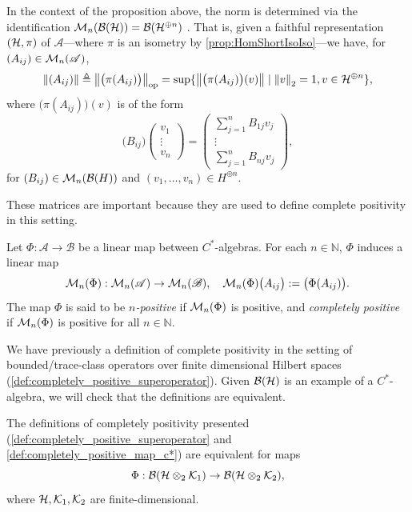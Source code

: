 In the context of the proposition above, the norm is determined via the identification $\mathcal{M}_n(\mathcal{B}(\mathcal{H})) =\mathcal{B}(\mathcal{H}^{\oplus n})$
\cite[Exercises~1.1 and~1.2]{paulsenCompletelyBoundedMaps2003}. That is, given a faithful representation \((\mathcal{H}, \pi)\) of \(\mathscr{A}\)---where \(\pi\) is an isometry by \autoref{prop:HomShortIsoIso}---we have, for \((A_{ij}) \in \mathcal{M}_{n}(\mathscr{A})\),
\[
\left\lVert (A_{ij}) \right\rVert \triangleq \left\lVert \big(\pi (A_{ij}) \big) \right\rVert_{\text{op}} = \sup\{ \left\lVert  \big(\pi (A_{ij}) \big) (v) \right\rVert \mid \left\lVert v \right\rVert_{2} = 1, v \in \mathcal{H}^{\oplus n} \},
\]
where $\big(\pi (A_{ij})\big) (v) $ is of the form 
\[
\bigl(B_{ij}\bigr)
\begin{pmatrix}
v_{1} \\
\vdots \\
v_{n}
\end{pmatrix}
=
\begin{pmatrix}
\displaystyle\sum_{j=1}^n B_{1j} v_{j} \\
\vdots \\
\displaystyle\sum_{j=1}^n B_{nj} v_{j}
\end{pmatrix},
\]
for $(B_{ij}) \in \mathcal{M}_{n}(\mathcal{B}(H))$ and $(v_1, \ldots, v_n) \in H^{\oplus n}$.


These matrices are important because they are used to define complete positivity in this setting.

\begin{definition} \label{def:completely_positive_map_c*}
  Let \( \Phi : \mathscr{A} \to \mathscr{B} \) be a linear map between \( C^* \)-algebras. For each \( n \in \mathbb{N} \), \( \Phi \) induces a linear map
\[
\mathcal{M}_{n}(\Phi) :\mathcal{M}_{n}(\mathscr{A}) \to \mathcal{M}_{n}(\mathscr{B}), \quad \mathcal{M}_{n}(\Phi)\big( A_{ij} \big) := \big( \Phi(A_{ij}) \big).
\]
The map \( \Phi \) is said to be \emph{\( n \)-positive} if \(\mathcal{M}_{n}(\Phi) \) is positive, and \emph{completely positive} if \( \mathcal{M}_{n}(\Phi) \) is positive for all \( n \in \mathbb{N} \).
\end{definition}

We have previously a definition of complete positivity in the setting of bounded/trace-class operators over finite dimensional Hilbert spaces (\autoref{def:completely_positive_superoperator}). Given $\mathcal{B}(\mathcal{H})$ is an example of a $C^*$-algebra, we will check that the definitions are equivalent.


\begin{proposition} \label{pro:cp_compatible}
  The definitions of completely positivity presented (\autoref{def:completely_positive_superoperator} and \autoref{def:completely_positive_map_c*}) are equivalent for maps 
  $$\Phi: \mathcal{B}(\mathcal{H} \otimes_2 \mathcal{K}_1 ) \to \mathcal{B}(\mathcal{H} \otimes_2 \mathcal{K}_2), $$
where $\mathcal{H}, \mathcal{K}_1,\mathcal{K}_2$ are finite-dimensional.
\end{proposition}


